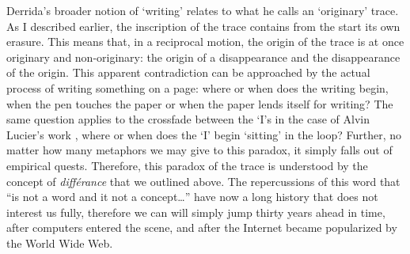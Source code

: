 Derrida's broader notion of `writing' relates to what he calls an `originary' trace. As I described earlier, the inscription of the trace contains from the start its own erasure. This means that, in a reciprocal motion, the origin of the trace is at once originary and non-originary: the origin of a disappearance and the disappearance of the origin. This apparent contradiction can be approached by the actual process of writing something on a page: where or when does the writing begin, when the pen touches the paper or when the paper lends itself for writing? The same question applies to the crossfade between the `I's in the case of Alvin Lucier's work , where or when does the `I' begin `sitting' in the loop? Further, no matter how many metaphors we may give to this paradox, it simply falls out of empirical quests. Therefore, this paradox of the trace is understood by the concept of \textit{différance} that we outlined above. The repercussions of this word that ``is not a word and it not a concept\dots'' have now a long history that does not interest us fully, therefore we can will simply jump thirty years ahead in time, after computers entered the scene, and after the Internet became popularized by the World Wide Web.

